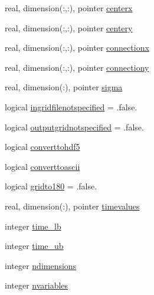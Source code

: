 \begin{DoxyCompactItemize}
\item 
real, dimension(\+:,\+:), pointer \mbox{\hyperlink{structmoduleera40format_1_1t__era40format_a65665bda8e1a3f5e52166c55e99c1d2c}{centerx}}
\item 
real, dimension(\+:,\+:), pointer \mbox{\hyperlink{structmoduleera40format_1_1t__era40format_a3b7f4f1218fdd91aae2b895776d877eb}{centery}}
\item 
real, dimension(\+:,\+:), pointer \mbox{\hyperlink{structmoduleera40format_1_1t__era40format_a485193dff469ecd799056c2f427e9fee}{connectionx}}
\item 
real, dimension(\+:,\+:), pointer \mbox{\hyperlink{structmoduleera40format_1_1t__era40format_adc44cb97b2cead29e8192a0acf80b4ba}{connectiony}}
\item 
real, dimension(\+:), pointer \mbox{\hyperlink{structmoduleera40format_1_1t__era40format_a87bc4e17093f506abc71ee13e10ee9a4}{sigma}}
\item 
logical \mbox{\hyperlink{structmoduleera40format_1_1t__era40format_a614b034f3acb3fcf53a000417149d3b7}{ingridfilenotspecified}} = .false.
\item 
logical \mbox{\hyperlink{structmoduleera40format_1_1t__era40format_a8a93974cf78550996c13145d4ef438f1}{outputgridnotspecified}} = .false.
\item 
logical \mbox{\hyperlink{structmoduleera40format_1_1t__era40format_ac244a73f3a564902f65230ccaab24a6a}{converttohdf5}}
\item 
logical \mbox{\hyperlink{structmoduleera40format_1_1t__era40format_a35297b862776ed5288ff12763a1f7f96}{converttoascii}}
\item 
logical \mbox{\hyperlink{structmoduleera40format_1_1t__era40format_a12c7548f90ae12c3d66c3ca4d6182531}{gridto180}} = .false.
\item 
real, dimension(\+:), pointer \mbox{\hyperlink{structmoduleera40format_1_1t__era40format_af52d370bd7da4f041cfb5652a300410b}{timevalues}}
\item 
integer \mbox{\hyperlink{structmoduleera40format_1_1t__era40format_a42a3905f5b8573eb057c00851aa352a8}{time\+\_\+lb}}
\item 
integer \mbox{\hyperlink{structmoduleera40format_1_1t__era40format_adf1f0ae21142ce82bed02d2e7b39203d}{time\+\_\+ub}}
\item 
integer \mbox{\hyperlink{structmoduleera40format_1_1t__era40format_ae476d7e966359600aab9b31bfde654f6}{ndimensions}}
\item 
integer \mbox{\hyperlink{structmoduleera40format_1_1t__era40format_afcf7bfc35c00dc13430b133b447f7a15}{nvariables}}

\end{DoxyCompactItemize}
